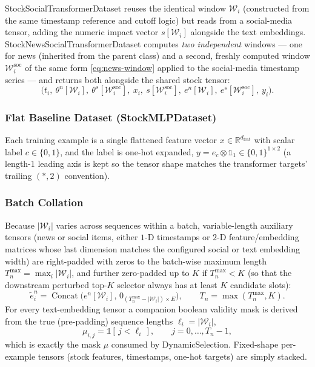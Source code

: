 \documentclass[stu,floatsintext]{apa7}
\newcommand{\R}{\mathbb{R}}
\newcommand{\Concat}{\operatorname{Concat}}
\newcommand{\I}{\mathbb{1}}
\begin{document}
StockSocialTransformerDataset reuses the identical window $\mathcal W_i$ (constructed from the
same timestamp reference and cutoff logic) but reads from a social-media tensor, adding the
numeric impact vector $s[\mathcal W_i]$ alongside the text embeddings.
StockNewsSocialTransformerDataset computes \emph{two independent} windows — one for news
(inherited from the parent class) and a second, freshly computed window $\mathcal W_i^{\mathrm{soc}}$ of
the same form \eqref{eq:news-window} applied to the social-media timestamp series — and returns both
alongside the shared stock tensor:
\begin{equation}
  \bigl(t_i,\ \theta^{n}[\mathcal W_i],\ \theta^{s}[\mathcal W_i^{\mathrm{soc}}],\ x_i,\
  s[\mathcal W_i^{\mathrm{soc}}],\ e^{n}[\mathcal W_i],\ e^{s}[\mathcal W_i^{\mathrm{soc}}],\ y_i \bigr).
\end{equation}

\subsubsection{Flat Baseline Dataset (StockMLPDataset)}

Each training example is a single flattened feature vector $x\in\R^{d_{\mathrm{feat}}}$ with scalar label
$c\in\{0,1\}$, and the label is one-hot expanded, $y = e_c\otimes\I_1 \in \{0,1\}^{1\times 2}$
(a length-$1$ leading axis is kept so the tensor shape matches the transformer targets' trailing $(*,2)$
convention).

\subsubsection{Batch Collation}

Because $|\mathcal W_i|$ varies across sequences within a batch, variable-length auxiliary tensors (news or
social items, either $1$-D timestamps or $2$-D feature/embedding matrices whose last dimension matches the
configured social or text embedding width) are right-padded with zeros to the batch-wise maximum length
$T_n^{\max} = \max_i |\mathcal W_i|$, and further zero-padded up to $K$ if $T_n^{\max}<K$ (so that the
downstream perturbed top-$K$ selector always has at least $K$ candidate slots):
\begin{equation}
  \tilde e^{n}_i = \Concat\bigl(e^n[\mathcal W_i],\, 0_{(T_n^{\max}-|\mathcal W_i|)\times E}\bigr), \qquad
  T_n = \max(T_n^{\max}, K).
\end{equation}
For every text-embedding tensor a companion boolean validity mask is derived from the true (pre-padding)
sequence lengths $\ell_i = |\mathcal W_i|$,
\begin{equation}
  \mu_{i,j} = \I[\, j < \ell_i \,], \qquad j=0,\dots,T_n-1,
\end{equation}
which is exactly the mask $\mu$ consumed by DynamicSelection. Fixed-shape per-example tensors
(stock features, timestamps, one-hot targets) are simply stacked.
\end{document}
